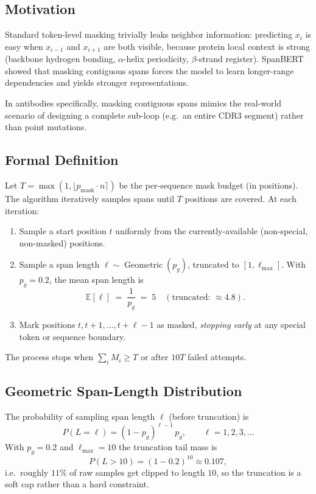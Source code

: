 \documentclass[11pt]{article}
\newcommand{\pmask}{p_{\text{mask}}}
\newcommand{\E}{\mathbb{E}}
\DeclareMathOperator{\Geom}{Geometric}
\begin{document}
\subsection{Motivation}
Standard token-level masking trivially leaks neighbor information:
predicting $x_i$ is easy when $x_{i-1}$ and $x_{i+1}$ are both visible,
because protein local context is strong (backbone hydrogen bonding,
$\alpha$-helix periodicity, $\beta$-strand register). SpanBERT showed
that masking contiguous spans forces the model to learn longer-range
dependencies and yields stronger representations.

In antibodies specifically, masking contiguous spans mimics the
real-world scenario of designing a complete sub-loop (e.g.\ an entire
CDR3 segment) rather than point mutations.

\subsection{Formal Definition}
Let $T = \max(1, \lfloor \pmask \cdot n \rceil)$ be the per-sequence
mask budget (in positions). The algorithm iteratively samples spans
until $T$ positions are covered. At each iteration:
\begin{enumerate}
\item Sample a start position $t$ uniformly from the currently-available
(non-special, non-masked) positions.
\item Sample a span length $\ell \sim \Geom(p_g)$, truncated to
$[1, \ell_{\max}]$. With $p_g = 0.2$, the mean span length is
\begin{equation}
\E[\ell] \;=\; \frac{1}{p_g} \;=\; 5 \quad (\text{truncated: } \approx 4.8).
\end{equation}
\item Mark positions $t, t+1, \dots, t+\ell-1$ as masked, \emph{stopping
early} at any special token or sequence boundary.
\end{enumerate}
The process stops when $\sum_i M_i \ge T$ or after $10T$ failed attempts.

\subsection{Geometric Span-Length Distribution}
The probability of sampling span length $\ell$ (before truncation) is
\begin{equation}
P(L = \ell) = (1 - p_g)^{\ell - 1}\, p_g, \qquad \ell = 1, 2, 3, \ldots
\end{equation}
With $p_g = 0.2$ and $\ell_{\max} = 10$ the truncation tail mass is
\begin{equation}
P(L > 10) = (1 - 0.2)^{10} \approx 0.107,
\end{equation}
i.e.\ roughly $11\%$ of raw samples get clipped to length $10$, so the
truncation is a soft cap rather than a hard constraint.
\end{document}
